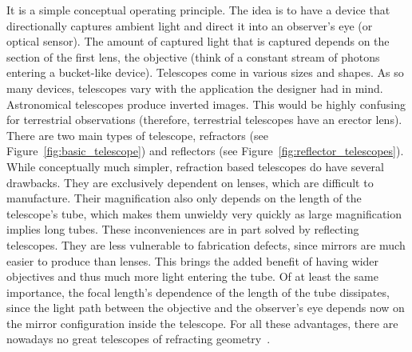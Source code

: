 It is a simple conceptual operating principle. The idea is to have a
device that directionally captures ambient light and direct it into an
observer's eye (or optical sensor). The amount of captured light that is
captured depends on the section of the first lens, the objective (think of a constant
stream of photons entering a bucket-like device). Telescopes come in
various sizes and shapes. As so many devices, telescopes vary with the
application the designer had in mind. Astronomical telescopes produce
inverted images. This would be highly confusing for terrestrial
observations (therefore, terrestrial telescopes have an erector lens).
There are two main types of telescope, refractors (see
Figure~\ref{fig:basic_telescope}) and reflectors (see
Figure~\ref{fig:reflector_telescopes}). While conceptually much simpler,
refraction based telescopes do have several drawbacks. They are
exclusively dependent on lenses, which are difficult to manufacture.
Their magnification also only depends on the length of the telescope's
tube, which makes them unwieldy very quickly as large magnification
implies long tubes. These inconveniences are in part solved by
reflecting telescopes. They are less vulnerable to fabrication defects,
since mirrors are much easier to produce than lenses. This brings the
added benefit of having wider objectives and thus much more light
entering the tube. Of at least the same importance, the focal length's
dependence of the length of the tube dissipates, since the light path
between the objective and the observer's eye depends now on the mirror
configuration inside the telescope. For all these advantages, there are
nowadays no great telescopes of refracting geometry~\cite{Smith2000,
Hecht2016}.

